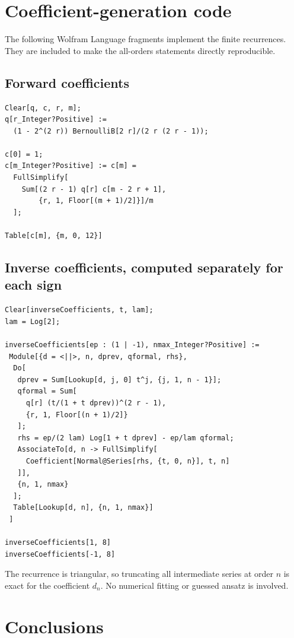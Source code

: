 \documentclass[11pt]{article}
\theoremstyle{definition}
\theoremstyle{remark}
\begin{document}
\section{Coefficient-generation code}

The following Wolfram Language fragments implement the finite recurrences.  They are included to make the all-orders statements directly reproducible.

\subsection{Forward coefficients}

\begin{lstlisting}
Clear[q, c, r, m];
q[r_Integer?Positive] :=
  (1 - 2^(2 r)) BernoulliB[2 r]/(2 r (2 r - 1));

c[0] = 1;
c[m_Integer?Positive] := c[m] =
  FullSimplify[
    Sum[(2 r - 1) q[r] c[m - 2 r + 1],
        {r, 1, Floor[(m + 1)/2]}]/m
  ];

Table[c[m], {m, 0, 12}]
\end{lstlisting}

\subsection{Inverse coefficients, computed separately for each sign}

\begin{lstlisting}
Clear[inverseCoefficients, t, lam];
lam = Log[2];

inverseCoefficients[ep : (1 | -1), nmax_Integer?Positive] :=
 Module[{d = <||>, n, dprev, qformal, rhs},
  Do[
   dprev = Sum[Lookup[d, j, 0] t^j, {j, 1, n - 1}];
   qformal = Sum[
     q[r] (t/(1 + t dprev))^(2 r - 1),
     {r, 1, Floor[(n + 1)/2]}
   ];
   rhs = ep/(2 lam) Log[1 + t dprev] - ep/lam qformal;
   AssociateTo[d, n -> FullSimplify[
     Coefficient[Normal@Series[rhs, {t, 0, n}], t, n]
   ]],
   {n, 1, nmax}
  ];
  Table[Lookup[d, n], {n, 1, nmax}]
 ]

inverseCoefficients[1, 8]
inverseCoefficients[-1, 8]
\end{lstlisting}

The recurrence is triangular, so truncating all intermediate series at order $n$ is exact for the coefficient $d_n$.  No numerical fitting or guessed ansatz is involved.

\section{Conclusions}
\end{document}
